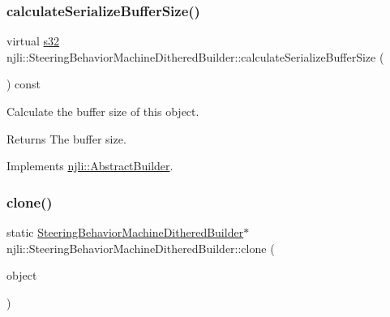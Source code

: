 \mbox{\label{classnjli_1_1_steering_behavior_machine_dithered_builder_a3a7280ffa7198b34164e73d280578f54}} 
\subsubsection{\texorpdfstring{calculate\+Serialize\+Buffer\+Size()}{calculateSerializeBufferSize()}}
{\footnotesize\ttfamily virtual \mbox{\hyperlink{_util_8h_aa62c75d314a0d1f37f79c4b73b2292e2}{s32}} njli\+::\+Steering\+Behavior\+Machine\+Dithered\+Builder\+::calculate\+Serialize\+Buffer\+Size (\begin{DoxyParamCaption}{ }\end{DoxyParamCaption}) const\hspace{0.3cm}{\ttfamily [virtual]}}

Calculate the buffer size of this object.

\begin{DoxyReturn}{Returns}
The buffer size. 
\end{DoxyReturn}


Implements \mbox{\hyperlink{classnjli_1_1_abstract_builder_aa1d220053e182c37b31b427499c6eacf}{njli\+::\+Abstract\+Builder}}.

\mbox{\label{classnjli_1_1_steering_behavior_machine_dithered_builder_abd47eb891a9e5279d5ed04081e6e95f5}} 
\subsubsection{\texorpdfstring{clone()}{clone()}}
{\footnotesize\ttfamily static \mbox{\hyperlink{classnjli_1_1_steering_behavior_machine_dithered_builder}{Steering\+Behavior\+Machine\+Dithered\+Builder}}$\ast$ njli\+::\+Steering\+Behavior\+Machine\+Dithered\+Builder\+::clone (\begin{DoxyParamCaption}\item[{const \mbox{\hyperlink{classnjli_1_1_steering_behavior_machine_dithered_builder}{Steering\+Behavior\+Machine\+Dithered\+Builder}} \&}]{object }\end{DoxyParamCaption})\hspace{0.3cm}{\ttfamily [static]}}


